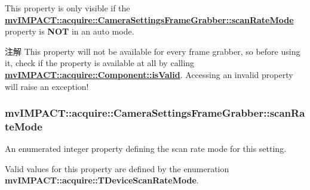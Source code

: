 This property is only visible if the {\bfseries \hyperlink{classmv_i_m_p_a_c_t_1_1acquire_1_1_camera_settings_frame_grabber_aa05a4927e747ee08384c74a348a63b6c}{mv\+I\+M\+P\+A\+C\+T\+::acquire\+::\+Camera\+Settings\+Frame\+Grabber\+::scan\+Rate\+Mode}} property is {\bfseries N\+O\+T} in an auto mode. \begin{DoxyNote}{注解}
This property will not be available for every frame grabber, so before using it, check if the property is available at all by calling {\bfseries \hyperlink{classmv_i_m_p_a_c_t_1_1acquire_1_1_component_ac51e55e7e046101f3c6119d84123abd5}{mv\+I\+M\+P\+A\+C\+T\+::acquire\+::\+Component\+::is\+Valid}}. Accessing an invalid property will raise an exception! 
\end{DoxyNote}
\hypertarget{classmv_i_m_p_a_c_t_1_1acquire_1_1_camera_settings_frame_grabber_aa05a4927e747ee08384c74a348a63b6c}{
\subsubsection[{scan\+Rate\+Mode}]{ mv\+I\+M\+P\+A\+C\+T\+::acquire\+::\+Camera\+Settings\+Frame\+Grabber\+::scan\+Rate\+Mode}}\label{classmv_i_m_p_a_c_t_1_1acquire_1_1_camera_settings_frame_grabber_aa05a4927e747ee08384c74a348a63b6c}


An enumerated integer property defining the scan rate mode for this setting. 

Valid values for this property are defined by the enumeration {\bfseries mv\+I\+M\+P\+A\+C\+T\+::acquire\+::\+T\+Device\+Scan\+Rate\+Mode}.

